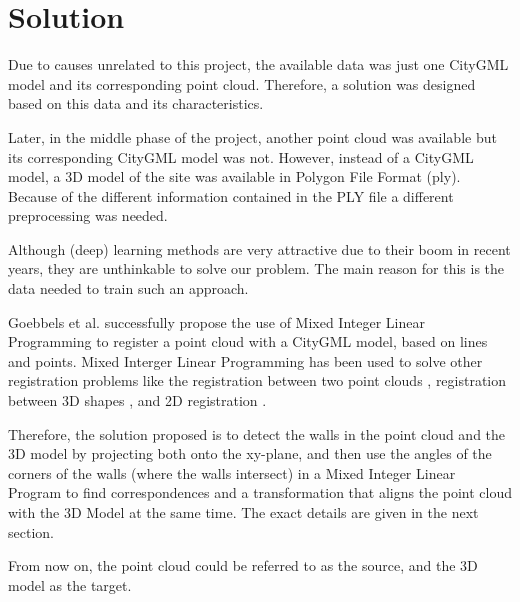 

    \chapter{Solution}
        Due to causes unrelated to this project, the available data was just one CityGML model and its corresponding point cloud.
        Therefore, a solution was designed based on this data and its characteristics.

        Later, in the middle phase of the project, another point cloud was available but its corresponding CityGML model was not.
        However, instead of a CityGML model, a 3D model of the site was available in Polygon File Format (ply).
        Because of the different information contained in the PLY file a different preprocessing was needed.

        Although (deep) learning methods are very attractive due to their boom in recent years,
        they are unthinkable to solve our problem. The main reason for this is the data needed to train such an approach.

        Goebbels et al. \cite{Goebbels_2018_linebased, Goebbels_2018_alinear} successfully propose the use of Mixed Integer Linear Programming to register
        a point cloud with a CityGML model, based on lines and points.
        Mixed Interger Linear Programming has been used to solve other registration problems
        like the registration between two point clouds \cite{Sakakubara_2007_automatic},
        registration between 3D shapes \cite{Windheuser_2011_largescale},
        and 2D registration \cite{Bazin_2013_abranchandbound}.

        Therefore, the solution proposed is to detect the walls in the point cloud and the 3D model by projecting both onto the xy-plane,  
        and then use the angles of the corners of the walls (where the walls intersect)
        in a Mixed Integer Linear Program to find correspondences and a transformation that aligns the point cloud with the 3D Model at the same time.
        The exact details are given in the next section.

        From now on, the point cloud could be referred to as the source, and the 3D model as the target.
     
